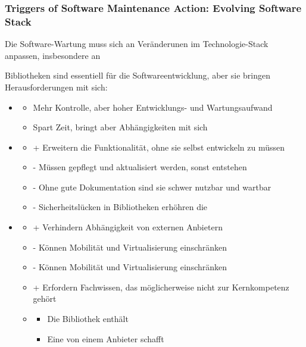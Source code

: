 \subsubsection*{Triggers of Software Maintenance Action: Evolving Software Stack}
\begin{infoBox}
    Die Software-Wartung muss sich an Veränderunen im Technologie-Stack anpassen, insbesondere an 
\end{infoBox}
\begin{infoBox}[title=Externe Softwarebibliotheken]
    Bibliotheken sind essentiell für die Softwareentwicklung, aber sie bringen Herausforderungen mit sich:
    \begin{itemize}
        \item {}
        \begin{itemize}
            \item {} Mehr Kontrolle, aber hoher Entwicklungs- und Wartungsaufwand
            \item {} Spart Zeit, bringt aber Abhängigkeiten mit sich
        \end{itemize}
        \item {}
        \begin{itemize}
            \item + Erweitern die Funktionalität, ohne sie selbst entwickeln zu müssen
            \item - Müssen gepflegt und aktualisiert werden, sonst entstehen 
            \item - Ohne gute Dokumentation sind sie schwer nutzbar und wartbar
            \item - Sicherheitslücken in Bibliotheken erhöhren die 
        \end{itemize}
        \item {}
        \begin{itemize}
            \item + Verhindern Abhängigkeit von externen Anbietern
            \item - Können Mobilität und Virtualisierung einschränken
            \item - Können Mobilität und Virtualisierung einschränken
            \item + Erfordern Fachwissen, das möglicherweise nicht zur Kernkompetenz gehört
            \item {}
            \begin{itemize}
                \item Die Bibliothek  enthält
                \item Eine  von einem Anbieter schafft
            \end{itemize}
        \end{itemize}
    \end{itemize}
\end{infoBox}
